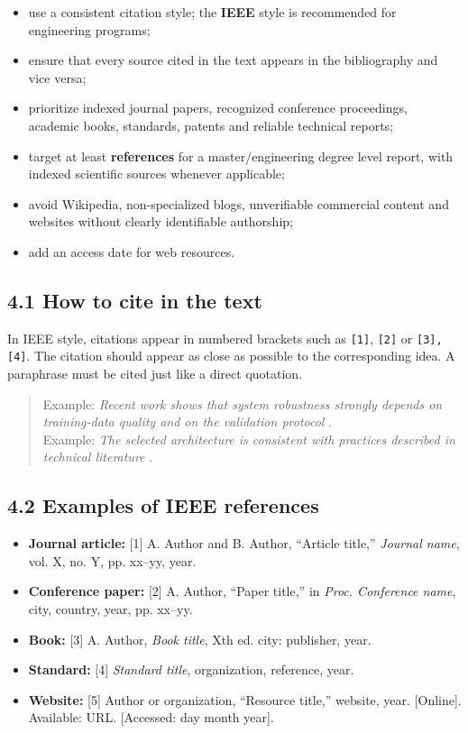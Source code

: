\begin{itemize}[leftmargin=1.2cm]
\item use a consistent citation style; the \textbf{IEEE} style is recommended for engineering programs;
\item ensure that every source cited in the text appears in the bibliography and vice versa;
\item prioritize indexed journal papers, recognized conference proceedings, academic books, standards, patents and reliable technical reports;
\item target at least \textbf{\MinReferences{} references} for a master/engineering degree level report, with \IndexedRatio{} indexed scientific sources whenever applicable;
\item avoid Wikipedia, non-specialized blogs, unverifiable commercial content and websites without clearly identifiable authorship;
\item add an access date for web resources.
\end{itemize}

\subsection*{4.1 How to cite in the text}

In IEEE style, citations appear in numbered brackets such as \texttt{[1]}, \texttt{[2]} or \texttt{[3], [4]}. The citation should appear as close as possible to the corresponding idea. A paraphrase must be cited just like a direct quotation.

\begin{quote}
Example: \textit{Recent work shows that system robustness strongly depends on training-data quality and on the validation protocol} \cite{example_journal_2024}. \\
Example: \textit{The selected architecture is consistent with practices described in technical literature} \cite{example_conference_2023,example_standard}.
\end{quote}

\subsection*{4.2 Examples of IEEE references}

\begin{itemize}[leftmargin=1.2cm]
\item \textbf{Journal article:} [1] A. Author and B. Author, \enquote{Article title,} \textit{Journal name}, vol. X, no. Y, pp. xx--yy, year.
\item \textbf{Conference paper:} [2] A. Author, \enquote{Paper title,} in \textit{Proc. Conference name}, city, country, year, pp. xx--yy.
\item \textbf{Book:} [3] A. Author, \textit{Book title}, Xth ed. city: publisher, year.
\item \textbf{Standard:} [4] \textit{Standard title}, organization, reference, year.
\item \textbf{Website:} [5] Author or organization, \enquote{Resource title,} website, year. [Online]. Available: URL. [Accessed: day month year].
\end{itemize}

